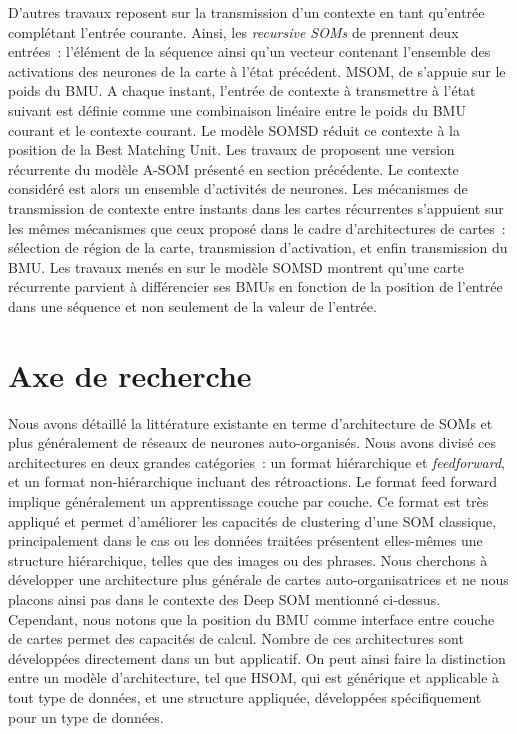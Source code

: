 \documentclass[../main]{subfiles}
\begin{document}
D'autres travaux reposent sur la transmission d'un contexte en tant qu'entrée complétant l'entrée courante. 
Ainsi, les \emph{recursive SOMs} de \cite{Voegtlin2002RecursiveSM} prennent deux entrées~: l'élément de la séquence ainsi qu'un vecteur contenant l'ensemble des activations des neurones de la carte à l'état précédent.
MSOM, de \cite{Strickert2005MergeSF} s'appuie sur le poids du BMU. A chaque instant, l'entrée de contexte à transmettre à l'état suivant est définie comme une combinaison linéaire entre le poids du BMU courant et le contexte courant.
Le modèle SOMSD \cite{hagenbuchner_self-organizing_2003, hammer_recursive_2004,hammer_self-organizing_2005, fix20} réduit ce contexte à la position de la Best Matching Unit.
Les travaux de \cite{Buonamente2013SimulatingAW} proposent une version récurrente du modèle A-SOM présenté en section précédente. Le contexte considéré est alors un ensemble d'activités de neurones.
Les mécanismes de transmission de contexte entre instants dans les cartes récurrentes s'appuient sur les mêmes mécanismes que ceux proposé dans le cadre d'architectures de cartes~: sélection de région de la carte, transmission d'activation, et enfin transmission du BMU.
Les travaux menés en \cite{fix20} sur le modèle SOMSD montrent qu'une carte récurrente parvient à différencier ses BMUs en fonction de la position de l'entrée dans une séquence et non seulement de la valeur de l'entrée.

\section{Axe de recherche}

Nous avons détaillé la littérature existante en terme d'architecture de SOMs et plus généralement de réseaux de neurones auto-organisés. Nous avons divisé ces architectures en deux grandes catégories~: un format hiérarchique et \emph{feedforward}, et un format non-hiérarchique incluant des rétroactions.
Le format feed forward implique généralement un apprentissage couche par couche. Ce format est très appliqué et permet d'améliorer les capacités de clustering d'une SOM classique, principalement dans le cas ou les données traitées présentent elles-mêmes une structure hiérarchique, telles que des images ou des phrases.
Nous cherchons à développer une architecture plus générale de cartes auto-organisatrices et ne nous placons ainsi pas dans le contexte des Deep SOM mentionné ci-dessus. 
Cependant, nous notons que la position du BMU comme interface entre couche de cartes permet des capacités de calcul.
Nombre de ces architectures sont développées directement dans un but applicatif. On peut ainsi faire la distinction entre un modèle d'architecture, tel que HSOM, qui est générique et applicable à tout type de données, et une structure appliquée, développées spécifiquement pour un type de données.
\end{document}
